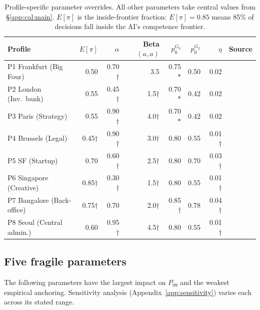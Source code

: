 \documentclass[11pt,a4paper]{article}
\begin{document}
\begin{appendices}
\begin{table}[H]
\centering\footnotesize
\setlength{\tabcolsep}{5pt}
\renewcommand{\arraystretch}{1.35}
\begin{tabular}{@{}l r r r r r r l@{}}
\toprule
\textbf{Profile} &
$E[\pi]$ &
$\alpha$ &
\textbf{Beta}$(a,a)$ &
$p_0^{G_0}$ &
$p_0^{G_2}$ &
$\eta$ &
\textbf{Source} \\
\midrule
P1 Frankfurt (Big Four)
  & 0.50 & 0.70$\dag$ & 3.5 & 0.75$\ast$ & 0.50 & 0.02
  & \cite{rivera_asr_2012} \\
P2 London (Inv.\ bank)
  & 0.55 & 0.45$\dag$ & 1.5$\dag$ & 0.70$\ast$ & 0.42 & 0.02
  & \cite{rivera_book_2015} \\
P3 Paris (Strategy)
  & 0.55 & 0.90$\dag$ & 4.0$\dag$ & 0.70$\ast$ & 0.42 & 0.02
  & \cite{bonneau_ipp_2021}\cite{bourdieu_noblesse_1989} \\
P4 Brussels (Legal)
  & 0.45$\dag$ & 0.90$\dag$ & 3.0$\dag$ & 0.80 & 0.55 & 0.01$\dag$
  & \cite{dahl_jla_2024} \\
P5 SF (Startup)
  & 0.70 & 0.60$\dag$ & 2.5$\dag$ & 0.80 & 0.70 & 0.03$\dag$
  & \cite{menlo_2025} \\
P6 Singapore (Creative)
  & 0.85$\dag$ & 0.30$\dag$ & 1.5$\dag$ & 0.80 & 0.55 & 0.01$\dag$
  & \cite{schneider_pp_1987} \\
P7 Bangalore (Back-office)
  & 0.75$\dag$ & 0.70 & 2.0$\dag$ & 0.85$\dag$ & 0.78 & 0.04$\dag$
  & \cite{oh_jorgbeh_2018}\cite{damato_emr_2021}\cite{schneider_jap_1998} \\
P8 Seoul (Central admin.)
  & 0.60 & 0.95$\dag$ & 4.5$\dag$ & 0.80 & 0.55 & 0.01$\dag$
  & \cite{oh_jorgbeh_2018} \\
\bottomrule
\end{tabular}
\caption{Profile-specific parameter overrides. All other parameters take
central values from \S\ref{app:cal:main}. $E[\pi]$ is the inside-frontier
fraction: $E[\pi] = 0.85$ means 85\% of decisions fall inside the AI's
competence frontier.}
\label{tab:profile_params}
\end{table}


\subsection{Five fragile parameters}\label{app:cal:sensitivity}

The following parameters have the largest impact on $P_{99}$ and the weakest
empirical anchoring. Sensitivity analysis (Appendix~\ref{app:sensitivity})
varies each across its stated range.


\end{appendices}
\end{document}
